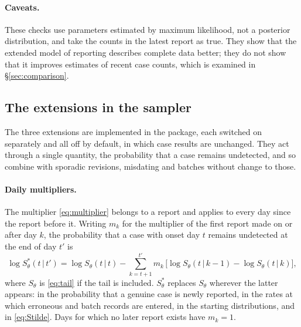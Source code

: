 \documentclass[11pt,a4paper]{article}
\newcommand{\given}{\,|\,}
\begin{document}
\paragraph{Caveats.} These checks use parameters estimated by maximum
likelihood, not a posterior distribution, and take the counts in the latest
report as true. They show that the extended model of reporting describes
complete data better; they do not show that it improves estimates of recent
case counts, which is examined in \S\ref{sec:comparison}.

\subsection{The extensions in the sampler}\label{sec:reportingsampler}

The three extensions are implemented in the package, each switched on
separately and all off by default, in which case results are unchanged. They
act through a single quantity, the probability that a case remains undetected,
and so combine with sporadic revisions, misdating and batches without change to
those.

\paragraph{Daily multipliers.} The multiplier \eqref{eq:multiplier} belongs to
a report and applies to every day since the report before it. Writing $m_k$
for the multiplier of the first report made on or after day $k$, the
probability that a case with onset day $t$ remains undetected at the end of
day $t'$ is
\begin{equation}\label{eq:Seffective}
\log S^{*}_\theta(t\given t') = \log S_\theta(t\given t)
-\sum_{k=t+1}^{t'} m_k\,\bigl[\log S_\theta(t\given k-1)-\log S_\theta(t\given k)\bigr],
\end{equation}
where $S_\theta$ is \eqref{eq:tail} if the tail is included. $S^{*}_\theta$
replaces $S_\theta$ wherever the latter appears: in the probability that a
genuine case is newly reported, in the rates at which erroneous and batch
records are entered, in the starting distributions, and in \eqref{eq:Stilde}.
Days for which no later report exists have $m_k=1$.
\end{document}
